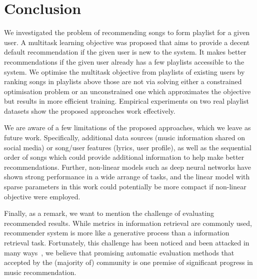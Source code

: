 \section{Conclusion}
We investigated the problem of recommending songs to form playlist for a given user.
A multitask learning objective was proposed that aims to provide a decent default recommendation 
if the given user is new to the system.
It makes better recommendations if the given user already has a few playlists accessible to the system.
We optimise the multitask objective from playlists of existing users by ranking songs in playlists above those are not
via solving either a constrained optimisation problem or an unconstrained one which approximates the objective but 
results in more efficient training.
Empirical experiments on two real playlist datasets show the proposed approaches work effectively.

We are aware of a few limitations of the proposed approaches, which we leave as future work.
Specifically, additional data sources (\eg music information shared on social media) or song/user 
features (\eg lyrics, user profile), as well as the sequential order of songs which could provide 
additional information to help make better recommendations.
Further, non-linear models such as deep neural networks have shown strong performance in a wide arrange of tasks,
and the linear model with sparse parameters in this work could potentially be more compact if non-linear objective were employed.

Finally, as a remark, we want to mention the challenge of evaluating recommended results.
While metrics in information retrieval are commonly used, recommender system is more like a generative process
than a information retrieval task. Fortunately, this challenge has been noticed and been attacked in many 
ways~\cite{mcfee2011natural,mcfee2012hypergraph,schedl2017}, 
we believe that promising automatic evaluation methods that accepted by the (majority of) 
community is one premise of significant progress in music recommendation.
